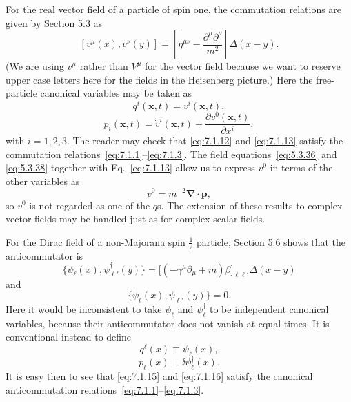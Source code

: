 For the real vector field of a particle of spin one, the commutation
relations are given by Section 5.3 as
\[
[v^\mu(x),v^\nu(y)]
=\left[\eta^{\mu\nu}-\frac{\partial^\mu\partial^\nu}{m^2}\right]\Delta(x-y).
\]
(We are using $v^\mu$ rather than $V^\mu$ for the vector field because we want to
reserve upper case letters here for the fields in the Heisenberg picture.)
Here the free-particle canonical variables may be taken as
\begin{equation}
q^i(\mathbf{x},t)=v^i(\mathbf{x},t),
\tag{7.1.12}\label{eq:7.1.12}
\end{equation}
\begin{equation}
p_i(\mathbf{x},t)=\dot v^i(\mathbf{x},t)+\frac{\partial v^0(\mathbf{x},t)}{\partial x^i},
\tag{7.1.13}\label{eq:7.1.13}
\end{equation}
with $i=1,2,3$. The reader may check that \eqref{eq:7.1.12} and \eqref{eq:7.1.13} satisfy
the commutation relations~\eqref{eq:7.1.1}--\eqref{eq:7.1.3}. The field equations~\eqref{eq:5.3.36} and
\eqref{eq:5.3.38} together with Eq.~\eqref{eq:7.1.13} allow us to express $v^0$ in terms of the
other variables as
\begin{equation}
v^0=m^{-2}\boldsymbol{\nabla}\cdot\mathbf{p},
\tag{7.1.14}\label{eq:7.1.14}
\end{equation}
so $v^0$ is not regarded as one of the $q$s. The extension of these results to
complex vector fields may be handled just as for complex scalar fields.

For the Dirac field of a non-Majorana spin $\tfrac12$ particle, Section 5.6 shows
that the anticommutator is
\[
\{\psi_\ell(x),\psi^\dagger_{\ell'}(y)\}
=\bigl[(-\gamma^\mu\partial_\mu+m)\beta\bigr]_{\ell\ell'}\Delta(x-y)
\]
and
\[
\{\psi_\ell(x),\psi_{\ell'}(y)\}=0.
\]
Here it would be inconsistent to take $\psi_\ell$ and $\psi_\ell^\dagger$ to be independent
canonical variables, because their anticommutator does not vanish at
equal times. It is conventional instead to define
\begin{equation}
q^\ell(x)\equiv\psi_\ell(x),
\tag{7.1.15}\label{eq:7.1.15}
\end{equation}
\begin{equation}
p_\ell(x)\equiv \ii\psi_\ell^\dagger(x).
\tag{7.1.16}\label{eq:7.1.16}
\end{equation}
It is easy then to see that \eqref{eq:7.1.15} and \eqref{eq:7.1.16} satisfy the canonical
anticommutation relations~\eqref{eq:7.1.1}--\eqref{eq:7.1.3}.

